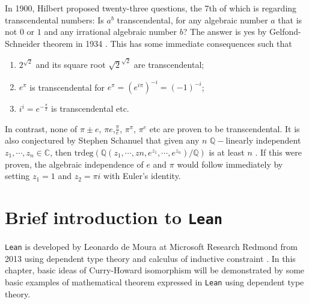 \documentclass{report}
\theoremstyle{definition}
\begin{document}
In 1900, Hilbert proposed twenty-three questions, the 7th of which is regarding transcendental numbers: Is $a^b$ transcendental, for any algebraic number $a$ that is not $0$ or $1$ and any irrational algebraic number $b$? The answer is yes by Gelfond-Schneider theorem in 1934 \cite{gelfond1934septieme}. This has some immediate consequences such that
\begin{enumerate}
  \item $2^{\sqrt2}$ and its square root ${\sqrt2}^{\sqrt2}$ are transcendental;
  \item $e^{\pi}$ is transcendental for $e^{\pi}=\left(e^{i\pi}\right)^{-i}=\left(-1\right)^{-i}$;
  \item $i^i=e^{-\frac\pi2}$ is transcendental etc.
\end{enumerate}
In contrast, none of $\pi\pm e$, $\pi e$,$\frac\pi e$, $\pi^\pi$, $\pi^e$ etc are proven to be transcendental. It is also conjectured by Stephen Schanuel that given any $n$ $\mathbb Q-$linearly independent $z_1,\cdots, z_n\in\mathbb C$, then $\mathrm{trdeg}\left(\mathbb Q(z_1,\cdots, zn, e^{z_1},\cdots, e^{z_n})/\mathbb Q\right)$ is at least $n$ \cite{lang1966introduction}. If this were proven, the algebraic independence of $e$ and $\pi$ would follow immediately by setting $z_1=1$ and $z_2=\pi i$ with Euler's identity.

\chapter{Brief introduction to {\tt Lean}}\label{intro:lean}

{\tt \small Lean} is developed by Leonardo de Moura at Microsoft Research Redmond from 2013 using dependent type theory and calculus of inductive constraint \cite{avigad2015theorem}. In this chapter, basic ideas of Curry-Howard isomorphism will be demonstrated by some basic examples of mathematical theorem expressed in {\tt \small Lean} using dependent type theory.
\end{document}

